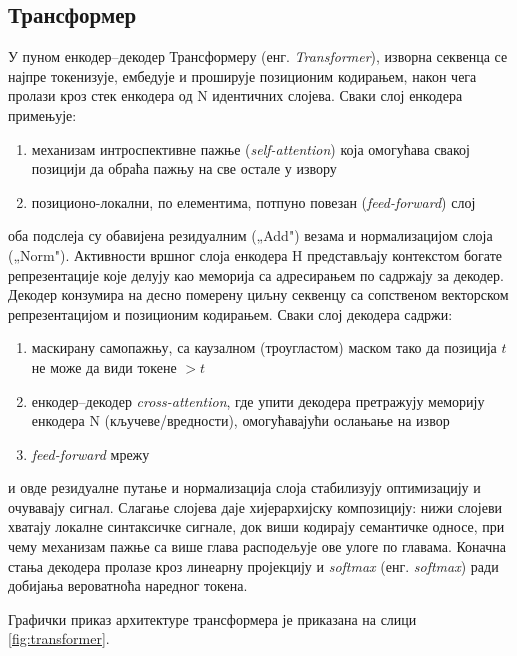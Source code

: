 \documentclass[a4paper, 12pt, master, utf8]{etf}
\begin{document}
\subsection{Трансформер}

У пуном енкодер--декодер Трансформеру (енг. \textit{Transformer}), изворна секвенца се најпре токенизује, ембедује и проширује позиционим кодирањем, након чега пролази кроз стек енкодера од N идентичних слојева. Сваки слој енкодера примењује:

\begin{enumerate}
\item механизам интроспективне пажње (\textit{self-attention}) која омогућава свакој позицији да обраћа пажњу на све остале у извору
\item позиционо-локални, по елементима, потпуно повезан (\textit{feed-forward}) слој
\end{enumerate}

оба подслеја су обавијена резидуалним („Add") везама и нормализацијом слоја („Norm"). Активности вршног слоја енкодера H представљају контекстом богате репрезентације које делују као меморија са адресирањем по садржају за декодер. Декодер конзумира на десно померену циљну секвенцу са сопственом векторском репрезентацијом и позиционим кодирањем. Сваки слој декодера садржи:

\begin{enumerate}
\item маскирану самопажњу, са каузалном (троугластом) маском тако да позиција $t$ не може да види токене $> t$
\item енкодер--декодер \textit{cross-attention}, где упити декодера претражују меморију енкодера N (кључеве/вредности), омогућавајући ослањање на извор
\item \textit{feed-forward} мрежу
\end{enumerate}

и овде резидуалне путање и нормализација слоја стабилизују оптимизацију и очувавају сигнал. Слагање слојева даје хијерархијску композицију: нижи слојеви хватају локалне синтаксичке сигнале, док виши кодирају семантичке односе, при чему механизам пажње са више глава расподељује ове улоге по главама. Коначна стања декодера пролазе кроз линеарну пројекцију и \textit{softmax} (енг. \textit{softmax}) ради добијања вероватноћа наредног токена.

Графички приказ архитектуре трансформера је приказана на слици \ref{fig:transformer}.
\end{document}
